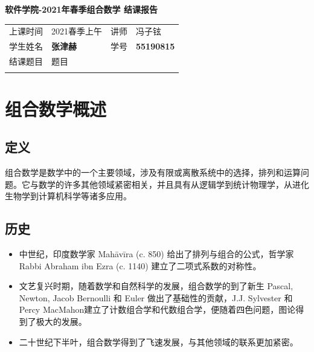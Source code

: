 \documentclass[12pt]{article} %
\begin{document}
\centerline{\LARGE\textbf{软件学院-2021年春季组合数学 结课报告}} 

\renewcommand\arraystretch{1.5}
\begin{table}[H]
\begin{tabular}{|m{3cm}<{\centering}|m{6cm}<{\centering}|m{2cm}<{\centering}|m{4.5cm}<{\centering}|}

\Xhline{1.1pt}
上课时间 &    2021春季上午     & 讲师 & 冯子铉 \\ 
\Xhline{1.1pt}
学生姓名 & \textbf{张津赫} & 学号 & \textbf{55190815} \\ 
\Xhline{1.1pt}
结课题目&\multicolumn{3}{|l|}{题目}
\\

\Xhline{1.1pt}
\end{tabular}
\end{table}

\vspace{200mm}




\tableofcontents
\thispagestyle{empty}

\newpage
\setcounter{page}{1}

\section{组合数学概述}
\subsection{定义}

组合数学是数学中的一个主要领域，涉及有限或离散系统中的选择，排列和运算问题。它与数学的许多其他领域紧密相关，并且具有从逻辑学到统计物理学，从进化生物学到计算机科学等诸多应用。
\subsection{历史}

\begin{itemize}

\item 中世纪，印度数学家 Mahāvīra (c. 850) 给出了排列与组合的公式，哲学家Rabbi Abraham ibn Ezra (c. 1140) 建立了二项式系数的对称性。
\item 文艺复兴时期，随着数学和自然科学的发展，组合数学的到了新生 Pascal, Newton, Jacob Bernoulli 和 Euler 做出了基础性的贡献，J.J. Sylvester 和 Percy MacMahon建立了计数组合学和代数组合学，便随着四色问题，图论得到了极大的发展。
\item 二十世纪下半叶，组合数学得到了飞速发展，与其他领域的联系更加紧密。
\end{itemize}
\end{document}
